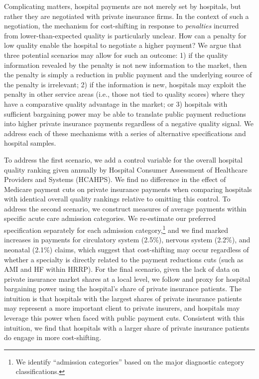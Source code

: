 \documentclass[12pt]{article}
\begin{document}
Complicating matters, hospital payments are not merely set by hospitals, but rather they are negotiated with private insurance firms. In the context of such a negotiation, the mechanism for cost-shifting in response to \textit{penalties} incurred from lower-than-expected quality is particularly unclear. How can a penalty for low quality enable the hospital to negotiate a higher payment? We argue that three potential scenarios may allow for such an outcome: 1) if the quality information revealed by the penalty is not new information to the market, then the penalty is simply a reduction in public payment and the underlying source of the penalty is irrelevant; 2) if the information is new, hospitals may exploit the penalty in other service areas (i.e., those not tied to quality scores) where they have a comparative quality advantage in the market; or 3) hospitals with sufficient bargaining power may be able to translate public payment reductions into higher private insurance payments regardless of a negative quality signal. We address each of these mechanisms with a series of alternative specifications and hospital samples.

To address the first scenario, we add a control variable for the overall hospital quality ranking given annually by Hospital Consumer Assessment of Healthcare Providers and Systems (HCAHPS).  We find no difference in the effect of Medicare payment cuts on private insurance payments when comparing hospitals with identical overall quality rankings relative to omitting this control.  To address the second scenario, we construct measures of average payments within specific acute care admission categories. We re-estimate our preferred specification separately for each admission category,\footnote{We identify ``admission categories'' based on the major diagnostic category classifications.} and we find marked increases in payments for circulatory system (2.5$\%$), nervous system (2.2$\%$), and neonatal (2.1$\%$) claims, which suggest that cost-shifting may occur regardless of whether a specialty is directly related to the payment reductions cuts (such as AMI and HF within HRRP).  For the final scenario, given the lack of data on private insurance market shares at a local level, we follow \cite{wu2010} and proxy for hospital bargaining power using the hospital's share of private insurance patients. The intuition is that hospitals with the largest shares of private insurance patients may represent a more important client to private insurers, and hospitals may leverage this power when faced with public payment cuts. Consistent with this intuition, we find that hospitals with a larger share of private insurance patients do engage in more cost-shifting.
\end{document}
